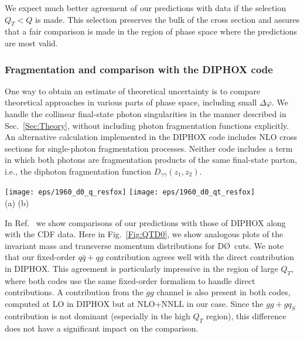 \documentclass[12pt,english,aps,preprint,prd,letterpaper,fleqn,nofootinbib,showpacs,showkeys,tightenlines,floatfix]{revtex4}
\begin{document}
We expect much better agreement of our predictions with data
if the selection $Q_{T}<Q$ is made. This selection preserves the
bulk of the cross section and assures that a fair comparison is made
in the region of phase space where the predictions are most valid.


\subsubsection{Fragmentation and comparison with the \textsc{DIPHOX} code}

One way to obtain an estimate of theoretical uncertainty is to compare
theoretical approaches in various parts of phase space, including
small $\Delta\varphi$. We handle the collinear final-state photon
singularities in the manner described in Sec.~\ref{Sec:Theory},
without including photon fragmentation functions explicitly. An alternative
calculation implemented in the \textsc{DIPHOX} code \cite{Binoth:1999qq}
includes NLO cross sections for single-photon fragmentation
processes. Neither code includes a term in which both photons are
fragmentation products of the same final-state parton, i.e., the diphoton
fragmentation function $D_{\gamma\gamma}(z_{1},z_{2})$.

\begin{figure*}
\begin{centering}\texttt{[image: eps/1960\_d0\_q\_resfox]}
\texttt{[image: eps/1960\_d0\_qt\_resfox]}\\
 (a) \hspace{0.45\columnwidth} (b) \par\end{centering}


\caption{Comparison of our resummed and \textsc{DIPHOX} predictions for (a)
the invariant mass and (b) transverse momentum distributions of $\gamma\gamma$
pairs for D\O~kinematic cuts. The solid curves show our resummed
distributions with all channels included. The dashed and dotted curves
illustrate the resummed and DIPHOX distributions in the $q\bar{q}+qg$
channel. \label{Fig:QTD0}}
\end{figure*}


In Ref.~\cite{Balazs:2006cc} we show comparisons of our predictions
with those of \textsc{DIPHOX} along with the CDF data. Here in Fig.~\ref{Fig:QTD0},
we show analogous plots of the invariant mass and transverse momentum
distributions for D\O~cuts. We note that our fixed-order $q\bar{q}+qg$
contribution agrees well with the direct contribution in \textsc{DIPHOX}.
This agreement is particularly impressive in the region of large $Q_{T}$,
where both codes use the same fixed-order formalism to handle direct
contributions. A contribution from the $gg$ channel is also present
in both codes, computed at LO in \textsc{DIPHOX} but at NLO+NNLL in
our case. Since the $gg+gq_{S}$ contribution is not dominant (especially
in the high $Q_{T}$ region), this difference does not have a significant
impact on the comparison. 
\end{document}
